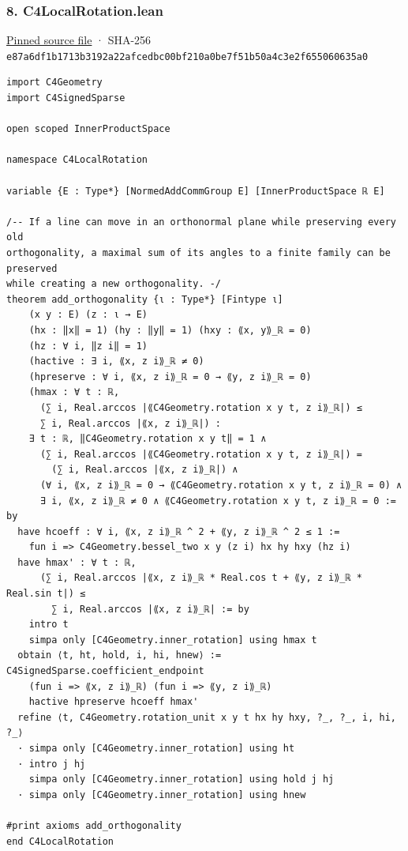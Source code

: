 \documentclass[11pt,a4paper]{article}
\begin{document}
\subsubsection{8. C4LocalRotation.lean}\label{c4localrotation.lean}

\href{https://github.com/mpelteshki/climbing-to-the-frontier/blob/29fbb70da18564048f62492e43870f2f96a65463/cagent/p1/C4LocalRotation.lean}{Pinned source file} · SHA-256 \texttt{e87a6df1\allowbreak{}b1713b31\allowbreak{}92a22afc\allowbreak{}edbc00bf\allowbreak{}210a0be7\allowbreak{}f51b50a4\allowbreak{}c3e2f655\allowbreak{}060635a0}

\begin{Verbatim}[breaklines,breakanywhere,fontsize=\footnotesize]
import C4Geometry
import C4SignedSparse

open scoped InnerProductSpace

namespace C4LocalRotation

variable {E : Type*} [NormedAddCommGroup E] [InnerProductSpace ℝ E]

/-- If a line can move in an orthonormal plane while preserving every old
orthogonality, a maximal sum of its angles to a finite family can be preserved
while creating a new orthogonality. -/
theorem add_orthogonality {ι : Type*} [Fintype ι]
    (x y : E) (z : ι → E)
    (hx : ‖x‖ = 1) (hy : ‖y‖ = 1) (hxy : ⟪x, y⟫_ℝ = 0)
    (hz : ∀ i, ‖z i‖ = 1)
    (hactive : ∃ i, ⟪x, z i⟫_ℝ ≠ 0)
    (hpreserve : ∀ i, ⟪x, z i⟫_ℝ = 0 → ⟪y, z i⟫_ℝ = 0)
    (hmax : ∀ t : ℝ,
      (∑ i, Real.arccos |⟪C4Geometry.rotation x y t, z i⟫_ℝ|) ≤
      ∑ i, Real.arccos |⟪x, z i⟫_ℝ|) :
    ∃ t : ℝ, ‖C4Geometry.rotation x y t‖ = 1 ∧
      (∑ i, Real.arccos |⟪C4Geometry.rotation x y t, z i⟫_ℝ|) =
        (∑ i, Real.arccos |⟪x, z i⟫_ℝ|) ∧
      (∀ i, ⟪x, z i⟫_ℝ = 0 → ⟪C4Geometry.rotation x y t, z i⟫_ℝ = 0) ∧
      ∃ i, ⟪x, z i⟫_ℝ ≠ 0 ∧ ⟪C4Geometry.rotation x y t, z i⟫_ℝ = 0 := by
  have hcoeff : ∀ i, ⟪x, z i⟫_ℝ ^ 2 + ⟪y, z i⟫_ℝ ^ 2 ≤ 1 :=
    fun i => C4Geometry.bessel_two x y (z i) hx hy hxy (hz i)
  have hmax' : ∀ t : ℝ,
      (∑ i, Real.arccos |⟪x, z i⟫_ℝ * Real.cos t + ⟪y, z i⟫_ℝ * Real.sin t|) ≤
        ∑ i, Real.arccos |⟪x, z i⟫_ℝ| := by
    intro t
    simpa only [C4Geometry.inner_rotation] using hmax t
  obtain ⟨t, ht, hold, i, hi, hnew⟩ := C4SignedSparse.coefficient_endpoint
    (fun i => ⟪x, z i⟫_ℝ) (fun i => ⟪y, z i⟫_ℝ)
    hactive hpreserve hcoeff hmax'
  refine ⟨t, C4Geometry.rotation_unit x y t hx hy hxy, ?_, ?_, i, hi, ?_⟩
  · simpa only [C4Geometry.inner_rotation] using ht
  · intro j hj
    simpa only [C4Geometry.inner_rotation] using hold j hj
  · simpa only [C4Geometry.inner_rotation] using hnew

#print axioms add_orthogonality
end C4LocalRotation
\end{Verbatim}
\end{document}

